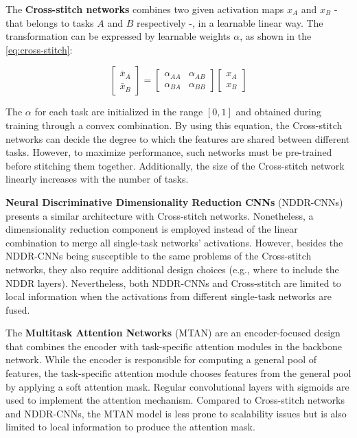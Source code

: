 The \textbf{Cross-stitch networks} \citep{misra2016cross} combines two given activation maps $x_A$ and $x_B$ - that belongs to tasks $A$ and $B$ respectively -, in a learnable linear way. The transformation can be expressed by learnable weights $\alpha$, as shown in the \autoref{eq:cross-stitch}:

\begin{equation}
\label{eq:cross-stitch}
\begin{bmatrix}
\bar{x}_A\\ 
\bar{x}_B
\end{bmatrix} = 
\begin{bmatrix}
\alpha_{AA} & \alpha_{AB} \\ 
\alpha_{BA} & \alpha_{BB}
\end{bmatrix}
\begin{bmatrix}
x_A \\ 
x_B
\end{bmatrix}
\end{equation}

The $\alpha$ for each task are initialized in the range $[0, 1]$ and obtained during training through a convex combination. By using this equation, the Cross-stitch networks can decide the degree to which the features are shared between different tasks. However, to maximize performance, such networks must be pre-trained before stitching them together. Additionally, the size of the Cross-stitch network linearly increases with the number of tasks. 

\textbf{Neural Discriminative Dimensionality Reduction CNNs} (NDDR-CNNs) \citep{gao2019nddr} presents a similar architecture with Cross-stitch networks. Nonetheless, a dimensionality reduction component is employed instead of the linear combination to merge all single-task networks' activations. However, besides the NDDR-CNNs being susceptible to the same problems of the Cross-stitch networks, they also require additional design choices (e.g., where to include the NDDR layers). Nevertheless, both NDDR-CNNs and Cross-stitch are limited to local information when the activations from different single-task networks are fused.

The \textbf{Multitask Attention Networks} (MTAN) \citep{liu2019end} are an encoder-focused design that combines the encoder with task-specific attention modules in the backbone network. While the encoder is responsible for computing a general pool of features, the task-specific attention module chooses features from the general pool by applying a soft attention mask. Regular convolutional layers with sigmoids are used to implement the attention mechanism. Compared to Cross-stitch networks and NDDR-CNNs, the MTAN model is less prone to scalability issues but is also limited to local information to produce the attention mask.

